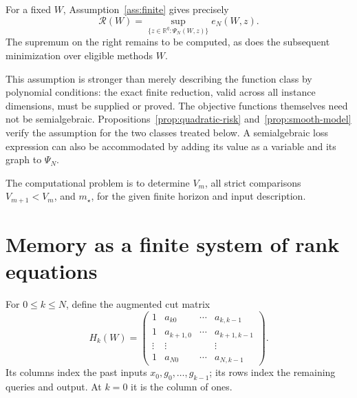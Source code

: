 \documentclass[11pt]{article}
\numberwithin{equation}{section}
\theoremstyle{definition}
\newcommand{\R}{\mathbb R}
\newcommand{\risk}{\mathcal R}
\begin{document}
For a fixed $W$, Assumption~\ref{ass:finite} gives precisely
\[
 \risk(W)=\sup_{\{z\in\R^q:\Psi_N(W,z)\}}e_N(W,z).
\]
The supremum on the right remains to be computed, as does the subsequent minimization over eligible methods $W$.

This assumption is stronger than merely describing the function class by polynomial conditions: the exact finite reduction, valid across all instance dimensions, must be supplied or proved. The objective functions themselves need not be semialgebraic. Propositions~\ref{prop:quadratic-risk} and~\ref{prop:smooth-model} verify the assumption for the two classes treated below. A semialgebraic loss expression can also be accommodated by adding its value as a variable and its graph to $\Psi_N$.

The computational problem is to determine $V_m$, all strict comparisons $V_{m+1}<V_m$, and $m_\star$, for the given finite horizon and input description.

\section{Memory as a finite system of rank equations}
\label{sec:memory}
For $0\le k\le N$, define the augmented cut matrix
\begin{equation}
 H_k(W)=
 \begin{pmatrix}
 1&a_{k0}&\cdots&a_{k,k-1}\\
 1&a_{k+1,0}&\cdots&a_{k+1,k-1}\\
 \vdots&\vdots&&\vdots\\
 1&a_{N0}&\cdots&a_{N,k-1}
 \end{pmatrix}.
 \label{eq:cut}
\end{equation}
Its columns index the past inputs $x_0,g_0,\ldots,g_{k-1}$; its rows index the remaining queries and output. At $k=0$ it is the column of ones.
\end{document}
